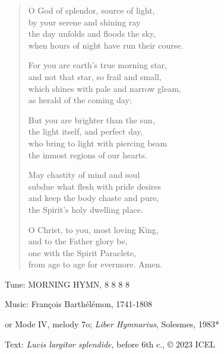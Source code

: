 \hymn

\begin{verse}
O God of splendor, source of light,\\
by your serene and shining ray\\
the day unfolds and floods the sky,\\
when hours of night have run their course.

For you are earth’s true morning star,\\
and not that star, so frail and small,\\
which shines with pale and narrow gleam,\\
as herald of the coming day;

But you are brighter than the sun,\\
the light itself, and perfect day,\\
who bring to light with piercing beam\\
the inmost regions of our hearts.

May chastity of mind and soul\\
subdue what flesh with pride desires\\
and keep the body chaste and pure,\\
the Spirit’s holy dwelling place.

O Christ, to you, most loving King,\\
and to the Father glory be,\\
one with the Spirit Paraclete,\\
from age to age for evermore. Amen.
\end{verse}

\begin{hymnsource}
Tune: MORNING HYMN, 8 8 8 8

Music: François Barthélémon, 1741-1808

or Mode IV, melody 7o; \emph{Liber Hymnarius}, Solesmes, 1983*

Text: \emph{Lucis largitor splendide}, before 6th c., © 2023 ICEL
\end{hymnsource}